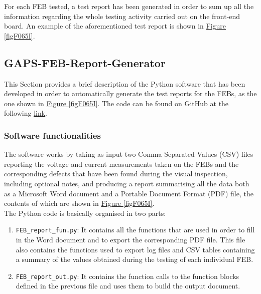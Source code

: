\par
For each FEB tested, a test report has been generated in order to sum up all the information regarding the whole testing activity carried out on the front-end board. An example of the aforementioned test report is shown in \hyperref[figF065I]{Figure \ref{figF065I}}. 

\normalsize


\subsection{GAPS-FEB-Report-Generator}
This Section provides a brief description of the Python software that has been developed in order to automatically generate the test reports for the FEBs, as the one shown in \hyperref[figF065I]{Figure \ref{figF065I}}. The code can be found on GitHub at the following \href{https://github.com/lucaghislo/GAPS-FEB-report-generator}{\underline{link}}.

\subsubsection{Software functionalities} \label{GAPSrepfun}
The software works by taking as input two Comma Separated Values (CSV) files reporting the voltage and current measurements taken on the FEBs and the corresponding defects that have been found during the visual inspection, including optional notes, and producing a report summarising all the data both as a Microsoft Word document and a Portable Document Format (PDF) file, the contents of which are shown in \hyperref[figF065I]{Figure \ref{figF065I}}.\\

\noindent
The Python code is basically organised in two parts:

\begin{enumerate}
    \itemsep0em
    \item \texttt{FEB\_report\_fun.py}: It contains all the functions that are used in order to fill in the Word document and to export the corresponding PDF file. This file also contains the functions used to export log files and CSV tables containing a summary of the values obtained during the testing of each individual FEB.
    \item \texttt{FEB\_report\_out.py}: It contains the function calls to the function blocks defined in the previous file and uses them to build the output document.
\end{enumerate}

